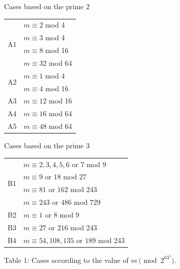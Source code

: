 \documentclass[table]{amsart}
\numberwithin{equation}{section}
\begin{document}
\begin{minipage}{.48\textwidth}   
\begin{center}
Cases based on the prime $2$
\begin{longtable}[h!]{|m{0.7cm}|m{2.75cm}|} 
\hline 
\multirow{4}{*}{A1} & $m \equiv 2$ mod 4\\ 
& $m \equiv 3$ mod 4\\
& $m \equiv 8$ mod 16\\
& $m \equiv 32$ mod 64\\ \hline
\multirow{2}{*}{A2} & $m \equiv 1$ mod 4\\ 
 & $m \equiv 4$ mod 16\\ \hline
A3 & $m \equiv 12$ mod 16\\ \hline
A4 & $m \equiv 16$ mod 64\\ \hline
A5 & $m\equiv 48$ mod 64 \\ \hline
\end{longtable}
\end{center}
    \end{minipage}  \hfill  
    \begin{minipage}{0.48\textwidth}
 \begin{center}
 Cases based on the prime $3$
\begin{longtable}[h!]{|m{0.7cm}|m{5.75cm}|} 
\hline 
\multirow{4}{*}{B1} & $m \equiv 2,3,4,5,6$ or $7$ mod 9\\ 
& $m \equiv 9$ or $18$ mod 27\\
& $m \equiv 81$ or $162$ mod 243\\
& $m \equiv 243$ or $486$ mod 729\\ \hline
{B2} & $m \equiv 1$ or $8$ mod 9\\ \hline
B3 & $m \equiv 27$ or $216$ mod 243\\ \hline
B4 & $m \equiv 54, 108, 135$ or $189$ mod 243\\ \hline
\end{longtable}
\end{center}     
    \end{minipage}
    \begin{center}
    Table 1: Cases according to the value of $m\pmod{2^63^5}$.
\end{center}
\end{document}
